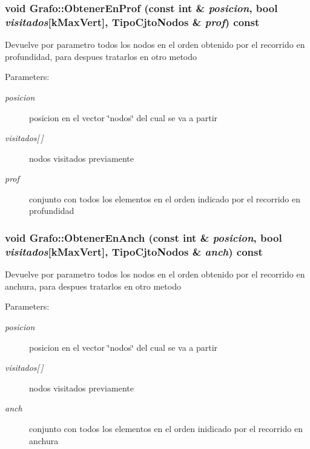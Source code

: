 \subsubsection{\setlength{\rightskip}{0pt plus 5cm}void Grafo::ObtenerEnProf (const int \& {\em posicion}, bool {\em visitados}[kMaxVert], {\bf TipoCjtoNodos} \& {\em prof}) const\hspace{0.3cm}{\tt  [private]}}\label{classGrafo_9d0eb1c3977698da6d05cd8b0d1d9c0c}


Devuelve por parametro todos los nodos en el orden obtenido por el recorrido en profundidad, para despues tratarlos en otro metodo \begin{Desc}
\item[Parameters:]
\begin{description}
\item[{\em posicion}]posicion en el vector \char`\"{}nodos\char`\"{} del cual se va a partir \item[{\em visitados\mbox{[}$\,$\mbox{]}}]nodos visitados previamente \item[{\em prof}]conjunto con todos los elementos en el orden indicado por el recorrido en profundidad \end{description}
\end{Desc}
\subsubsection{\setlength{\rightskip}{0pt plus 5cm}void Grafo::ObtenerEnAnch (const int \& {\em posicion}, bool {\em visitados}[kMaxVert], {\bf TipoCjtoNodos} \& {\em anch}) const\hspace{0.3cm}{\tt  [private]}}\label{classGrafo_f085eaf3d58dbcdaa78f0514f9b42d40}


Devuelve por parametro todos los nodos en el orden obtenido por el recorrido en anchura, para despues tratarlos en otro metodo \begin{Desc}
\item[Parameters:]
\begin{description}
\item[{\em posicion}]posicion en el vector \char`\"{}nodos\char`\"{} del cual se va a partir \item[{\em visitados\mbox{[}$\,$\mbox{]}}]nodos visitados previamente \item[{\em anch}]conjunto con todos los elementos en el orden inidicado por el recorrido en anchura \end{description}
\end{Desc}



